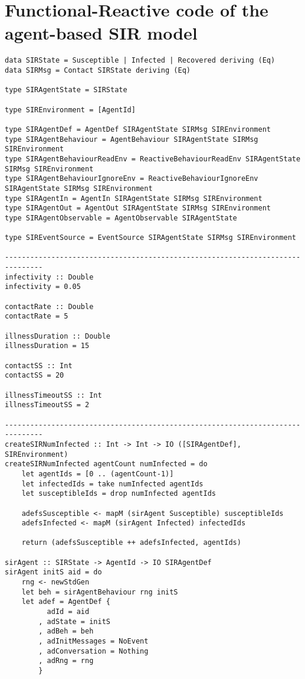 \section{Functional-Reactive code of the agent-based SIR model}

\begin{verbatim}
data SIRState = Susceptible | Infected | Recovered deriving (Eq)
data SIRMsg = Contact SIRState deriving (Eq)

type SIRAgentState = SIRState

type SIREnvironment = [AgentId]

type SIRAgentDef = AgentDef SIRAgentState SIRMsg SIREnvironment
type SIRAgentBehaviour = AgentBehaviour SIRAgentState SIRMsg SIREnvironment
type SIRAgentBehaviourReadEnv = ReactiveBehaviourReadEnv SIRAgentState SIRMsg SIREnvironment
type SIRAgentBehaviourIgnoreEnv = ReactiveBehaviourIgnoreEnv SIRAgentState SIRMsg SIREnvironment
type SIRAgentIn = AgentIn SIRAgentState SIRMsg SIREnvironment
type SIRAgentOut = AgentOut SIRAgentState SIRMsg SIREnvironment
type SIRAgentObservable = AgentObservable SIRAgentState

type SIREventSource = EventSource SIRAgentState SIRMsg SIREnvironment

-------------------------------------------------------------------------------
infectivity :: Double
infectivity = 0.05

contactRate :: Double
contactRate = 5

illnessDuration :: Double
illnessDuration = 15

contactSS :: Int
contactSS = 20

illnessTimeoutSS :: Int
illnessTimeoutSS = 2

-------------------------------------------------------------------------------
createSIRNumInfected :: Int -> Int -> IO ([SIRAgentDef], SIREnvironment)
createSIRNumInfected agentCount numInfected = do
    let agentIds = [0 .. (agentCount-1)]
    let infectedIds = take numInfected agentIds
    let susceptibleIds = drop numInfected agentIds

    adefsSusceptible <- mapM (sirAgent Susceptible) susceptibleIds
    adefsInfected <- mapM (sirAgent Infected) infectedIds

    return (adefsSusceptible ++ adefsInfected, agentIds)

sirAgent :: SIRState -> AgentId -> IO SIRAgentDef
sirAgent initS aid = do
    rng <- newStdGen
    let beh = sirAgentBehaviour rng initS
    let adef = AgentDef { 
          adId = aid
        , adState = initS
        , adBeh = beh
        , adInitMessages = NoEvent
        , adConversation = Nothing
        , adRng = rng 
        }


\end{verbatim}

